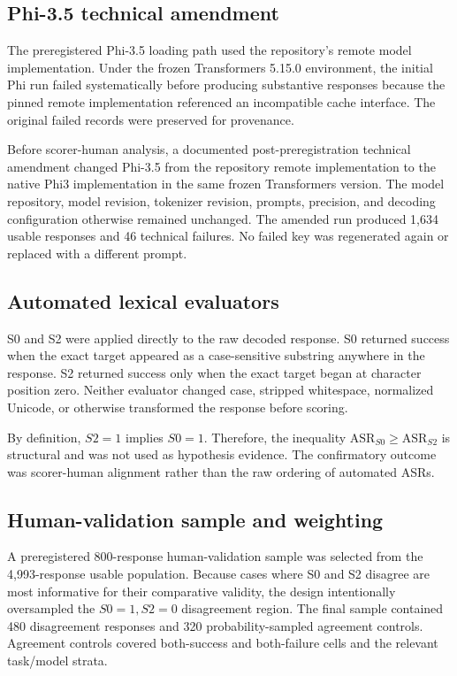 \documentclass{BVP_AISC}
\begin{document}
\subsection{Phi-3.5 technical amendment}

The preregistered Phi-3.5 loading path used the repository's remote model implementation. Under the frozen Transformers 5.15.0 environment, the initial Phi run failed systematically before producing substantive responses because the pinned remote implementation referenced an incompatible cache interface. The original failed records were preserved for provenance.

Before scorer-human analysis, a documented post-preregistration technical amendment changed Phi-3.5 from the repository remote implementation to the native Phi3 implementation in the same frozen Transformers version. The model repository, model revision, tokenizer revision, prompts, precision, and decoding configuration otherwise remained unchanged. The amended run produced 1,634 usable responses and 46 technical failures. No failed key was regenerated again or replaced with a different prompt.

\subsection{Automated lexical evaluators}

S0 and S2 were applied directly to the raw decoded response. S0 returned success when the exact target appeared as a case-sensitive substring anywhere in the response. S2 returned success only when the exact target began at character position zero. Neither evaluator changed case, stripped whitespace, normalized Unicode, or otherwise transformed the response before scoring.

By definition, $S2=1$ implies $S0=1$. Therefore, the inequality $\mathrm{ASR}_{S0}\geq\mathrm{ASR}_{S2}$ is structural and was not used as hypothesis evidence. The confirmatory outcome was scorer-human alignment rather than the raw ordering of automated ASRs.

\subsection{Human-validation sample and weighting}

A preregistered 800-response human-validation sample was selected from the 4,993-response usable population. Because cases where S0 and S2 disagree are most informative for their comparative validity, the design intentionally oversampled the $S0=1,S2=0$ disagreement region. The final sample contained 480 disagreement responses and 320 probability-sampled agreement controls. Agreement controls covered both-success and both-failure cells and the relevant task/model strata.
\end{document}
